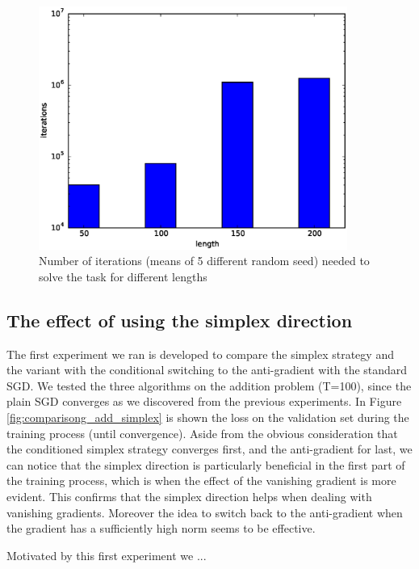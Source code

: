 \begin{figure}
	\centering
	\includegraphics[width= 0.9\textwidth]{chapter4/spectral_init_exp.eps}
	\caption{Number of iterations (means of 5 different random seed) needed to solve the task for different lengths}
	\label{fig:spectral_init_effect}
\end{figure}


\subsection{The effect of using the simplex direction}
The first experiment we ran is developed to compare the simplex strategy and the variant with the conditional switching to the anti-gradient with the standard SGD. We tested the three algorithms on the addition problem (T=100), since the plain SGD converges as we discovered from the previous experiments. In Figure \ref{fig:comparisong_add_simplex} is shown the loss on the validation set during the training process (until convergence). Aside from the obvious consideration that the conditioned simplex strategy converges first, and the anti-gradient for last, we can notice that the simplex direction is particularly beneficial in the first part of the training process, which is when the effect of the vanishing gradient is more evident. This confirms that the simplex direction helps when dealing with vanishing gradients. Moreover the idea to switch back to the anti-gradient when the gradient has a sufficiently high norm seems to be effective.

Motivated by this first experiment we ...

